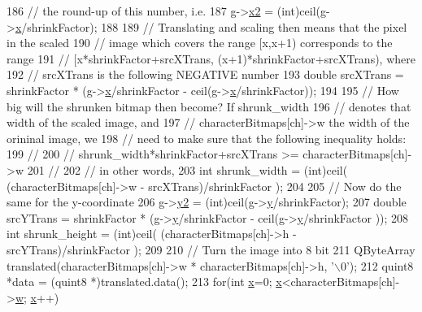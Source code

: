 \begin{DoxyCode}
{186     \textcolor{comment}{// the round-up of this number, i.e.}
187     g->\hyperlink{classglyph_a07a7aa840a9a34588a5cc02508ac5e6d}{x2} = (int)ceil(g->\hyperlink{classglyph_aa030c1619dd07d04f843c5ee9a54dde1}{x}/shrinkFactor);
188 
189     \textcolor{comment}{// Translating and scaling then means that the pixel in the scaled}
190     \textcolor{comment}{// image which covers the range [x,x+1) corresponds to the range}
191     \textcolor{comment}{// [x*shrinkFactor+srcXTrans, (x+1)*shrinkFactor+srcXTrans), where}
192     \textcolor{comment}{// srcXTrans is the following NEGATIVE number}
193     \textcolor{keywordtype}{double} srcXTrans = shrinkFactor * (g->\hyperlink{classglyph_aa030c1619dd07d04f843c5ee9a54dde1}{x}/shrinkFactor - ceil(g->\hyperlink{classglyph_aa030c1619dd07d04f843c5ee9a54dde1}{x}/shrinkFactor));
194 
195     \textcolor{comment}{// How big will the shrunken bitmap then become? If shrunk\_width}
196     \textcolor{comment}{// denotes that width of the scaled image, and}
197     \textcolor{comment}{// characterBitmaps[ch]->w the width of the orininal image, we}
198     \textcolor{comment}{// need to make sure that the following inequality holds:}
199     \textcolor{comment}{//}
200     \textcolor{comment}{// shrunk\_width*shrinkFactor+srcXTrans >= characterBitmaps[ch]->w}
201     \textcolor{comment}{//}
202     \textcolor{comment}{// in other words,}
203     \textcolor{keywordtype}{int} shrunk\_width  = (int)ceil( (characterBitmaps[ch]->w - srcXTrans)/shrinkFactor );
204 
205     \textcolor{comment}{// Now do the same for the y-coordinate}
206     g->\hyperlink{classglyph_afa1607f13eb1db99a5a3b1c92d47db7f}{y2} = (int)ceil(g->\hyperlink{classglyph_ac9b8f10a7be77024f34c723eeea34bf3}{y}/shrinkFactor);
207     \textcolor{keywordtype}{double} srcYTrans = shrinkFactor * (g->\hyperlink{classglyph_ac9b8f10a7be77024f34c723eeea34bf3}{y}/shrinkFactor - ceil(g->\hyperlink{classglyph_ac9b8f10a7be77024f34c723eeea34bf3}{y}/shrinkFactor ));
208     \textcolor{keywordtype}{int} shrunk\_height = (int)ceil( (characterBitmaps[ch]->h - srcYTrans)/shrinkFactor );
209 
210     \textcolor{comment}{// Turn the image into 8 bit}
211     QByteArray translated(characterBitmaps[ch]->w * characterBitmaps[ch]->h, \textcolor{charliteral}{'\(\backslash\)0'});
212     quint8 *data = (quint8 *)translated.data();
213     \textcolor{keywordflow}{for}(\textcolor{keywordtype}{int} \hyperlink{classglyph_aa030c1619dd07d04f843c5ee9a54dde1}{x}=0; \hyperlink{classglyph_aa030c1619dd07d04f843c5ee9a54dde1}{x}<characterBitmaps[ch]->\hyperlink{structbitmap_a955acbe13f247a259cbe10ced3a212fd}{w}; \hyperlink{classglyph_aa030c1619dd07d04f843c5ee9a54dde1}{x}++)
}
\end{DoxyCode}
